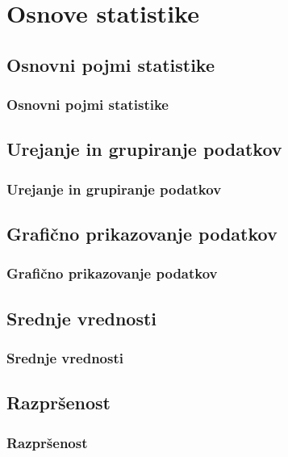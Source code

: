 \section{Osnove statistike}

\begin{frame}
    \sectionpage
\end{frame}

\begin{frame}
\end{frame}

    \subsection{Osnovni pojmi statistike}

        \begin{frame}
            \frametitle{Osnovni pojmi statistike}
        \end{frame}

    \subsection{Urejanje in grupiranje podatkov}

        \begin{frame}
            \frametitle{Urejanje in grupiranje podatkov}
        \end{frame}

    \subsection{Grafično prikazovanje podatkov}

        \begin{frame}
            \frametitle{Grafično prikazovanje podatkov}
        \end{frame}

    \subsection{Srednje vrednosti}

        \begin{frame}
            \frametitle{Srednje vrednosti}
        \end{frame}

    \subsection{Razpršenost}

        \begin{frame}
            \frametitle{Razpršenost}
        \end{frame}

